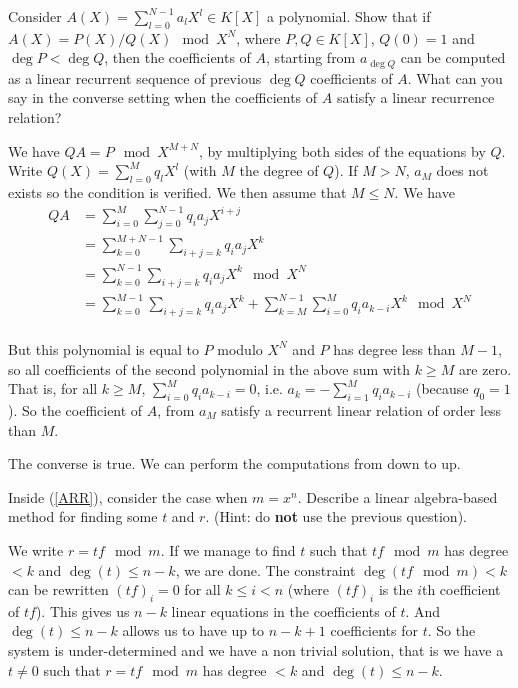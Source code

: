 \documentclass[11pt]{exam}
\theoremstyle{definition}
\begin{document}
{\begin{questions}
	\question Consider $A(X)=\sum_{l= 0}^{N-1}a_lX^l\in K[X]$ a polynomial. Show that if $A(X)=P(X)/Q(X) \mod X^{N}$, where $P,Q\in K[X]$, $Q(0)=1$ and $\deg P < \deg Q $, then the coefficients of $A$, starting from $a_{\deg Q}$ can be computed as a linear recurrent sequence of previous $\deg Q$ coefficients of $A$. What can you say in the converse setting when the coefficients of $A$ satisfy a linear recurrence relation?
	
	\begin{solution}
		We have $QA = P \mod X^{M+N}$, by multiplying both sides of the equations by $Q$. Write $Q(X) = \sum_{l= 0}^{M}q_lX^l$ (with $M$ the degree of $Q$). If $M > N$, $a_M$ does not exists so the condition is verified. We then assume that $M \leq N$. We have
		\begin{align*}
		QA
		&= \sum_{i= 0}^{M}\sum_{j= 0}^{N-1}q_ia_jX^{i+j} \\
		&= \sum_{k= 0}^{M+N-1} \sum_{i+j = k}q_ia_jX^{k} \\
		&= \sum_{k= 0}^{N-1} \sum_{i+j = k}q_ia_jX^{k} \mod X^N \\
		&= \sum_{k= 0}^{M-1} \sum_{i+j = k}q_ia_jX^{k} + \sum_{k= M}^{N-1} \sum_{i=0}^M q_ia_{k-i}X^{k} \mod X^N \\
		\end{align*}
		
		But this polynomial is equal to $P$ modulo $X^N$ and $P$ has degree less than $M-1$, so all coefficients of the second polynomial in the above sum with $k \geq M$ are zero. That is, for all $k \geq M$, $\sum_{i=0}^M q_ia_{k-i} = 0$, i.e. $a_k = -\sum_{i=1}^M q_ia_{k-i}$ (because $q_0 = 1$). So the coefficient of $A$, from $a_M$ satisfy a recurrent linear relation of order less than $M$.
		
		The converse is true. We can perform the computations from down to up.
	\end{solution}
	
	
	\question Inside (\ref{ARR}), consider the case when $m=x^n$. Describe a linear algebra-based method for finding some $t$ and $r$. (Hint: do \textbf{not} use the previous question).
	
	\begin{solution}
		We write $r = tf \mod m$. If we manage to find $t$ such that $tf \mod m$ has degree $< k$ and $\deg(t) \leq n-k$, we are done. The constraint $\deg(tf \mod m) < k$ can be rewritten $(tf)_i = 0$ for all $k \leq i < n$ (where $(tf)_i$ is the $i$th coefficient of $tf$). This gives us $n-k$ linear equations in the coefficients of $t$. And $\deg(t) \leq n-k$ allows us to have up to $n-k+1$ coefficients for $t$. So the system is under-determined and we have a non trivial solution, that is we have a $t \neq 0$ such that $r = tf \mod m$ has degree $< k$ and $\deg(t) \leq n-k$.
	\end{solution}
	

\end{questions}}
\end{document}
